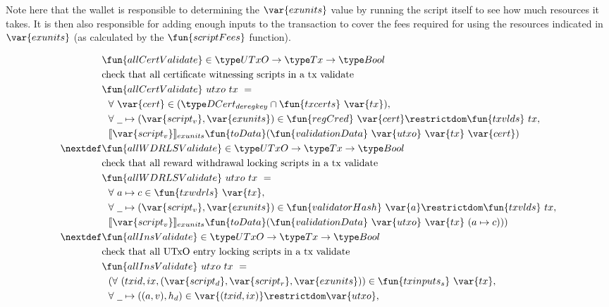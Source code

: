 Note here that the wallet is responsible to determining the $\var{exunits}$ value
by running the script itself to see how much resources it takes. It is then
also responsible for adding enough inputs to the transaction to cover the
fees required for using the resources indicated in $\var{exunits}$ (as
calculated by the $\fun{scriptFees}$ function).

\begin{figure}[htb]
  \begin{align*}
    & \fun{allCertValidate} \in \UTxO \to \Tx \to \Bool \\
    & \text{check that all certificate witnessing scripts in a tx validate} \\
    & \fun{allCertValidate}~{utxo}~{tx}~=~ \\
    & ~~\forall~\var{cert} \in
    (\DCertDeRegKey\cap\fun{txcerts}~\var{tx}), \\
    &~~\forall~\wcard\mapsto (\var{script_v},\var{exunits})\in \fun{regCred}~\var{cert}\restrictdom\fun{txvlds}~{tx}, \\
    & ~~ \llbracket \var{script_v} \rrbracket_{exunits}
    \fun{toData}(\fun{validationData}~\var{utxo}~\var{tx}~\var{cert})  \\
    \nextdef
    & \fun{allWDRLSValidate} \in \UTxO \to \Tx \to \Bool \\
    & \text{check that all reward withdrawal locking scripts in a tx validate} \\
    & \fun{allWDRLSValidate}~{utxo}~{tx}~=~ \\
    & ~~\forall~a \mapsto c \in\fun{txwdrls}~\var{tx}, \\
    & ~~ \forall~ \wcard\mapsto (\var{script_v},\var{exunits})\in \fun{validatorHash}~\var{a}\restrictdom\fun{txvlds}~{tx}, \\
    & ~~ \llbracket \var{script_v} \rrbracket_{exunits}
    \fun{toData}(\fun{validationData}~\var{utxo}~\var{tx}~
      (a\mapsto c)))  \\
    \nextdef
    & \fun{allInsValidate} \in \UTxO \to \Tx \to \Bool \\
    & \text{check that all UTxO entry locking scripts in a tx validate} \\
    & \fun{allInsValidate}~{utxo}~{tx}~=~ \\
    & ~~(\forall~(txid,ix,(\var{script_d},\var{script_r},\var{exunits})) \in
    \fun{txinputs_s}~\var{tx}, \\
    & ~~ \forall~\wcard \mapsto ((a,v),h_d) \in \var{(txid,ix)}\restrictdom\var{utxo}, \\

\end{align*}
\end{figure}
